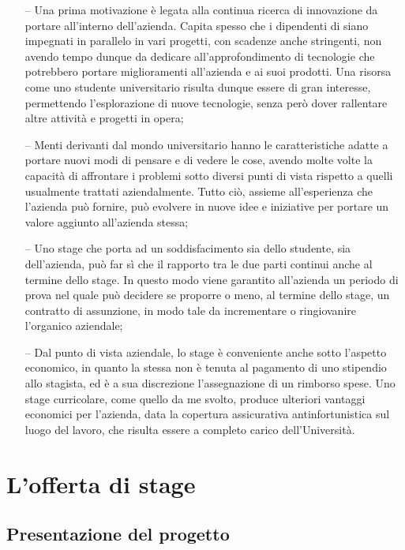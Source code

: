 \begin{itemize}
	\item[--] {Una prima motivazione è legata alla continua ricerca di innovazione da portare all'interno dell'azienda. Capita spesso che i dipendenti di \nomeAzienda siano impegnati in parallelo in vari progetti, con scadenze anche stringenti, non avendo tempo dunque da dedicare all'approfondimento di tecnologie che potrebbero portare miglioramenti all'azienda e ai suoi prodotti. Una risorsa come uno studente universitario risulta dunque essere di gran interesse, permettendo l'esplorazione di nuove tecnologie, senza però dover rallentare altre attività e progetti in opera;}

	\item[--] {Menti derivanti dal mondo universitario hanno le caratteristiche adatte a portare nuovi modi di pensare e di vedere le cose, avendo molte volte la capacità di affrontare i problemi sotto diversi punti di vista rispetto a quelli usualmente trattati aziendalmente. Tutto ciò, assieme all'esperienza che l'azienda può fornire, può evolvere in nuove idee e iniziative per portare un valore aggiunto all'azienda stessa;}
	
	\item[--] {Uno stage che porta ad un soddisfacimento sia dello studente, sia dell'azienda, può far sì che il rapporto tra le due parti continui anche al termine dello stage. In questo modo viene garantito all'azienda un periodo di prova nel quale può decidere se proporre o meno, al termine dello stage, un contratto di assunzione, in modo tale da incrementare o ringiovanire l'organico aziendale;}
	
	\item[--] {Dal punto di vista aziendale, lo stage è conveniente anche sotto l'aspetto economico, in quanto la stessa non è tenuta al pagamento di uno stipendio allo stagista, ed è a sua discrezione l'assegnazione di un rimborso spese. Uno stage curricolare, come quello da me svolto, produce ulteriori vantaggi economici per l'azienda, data la copertura assicurativa antinfortunistica sul luogo del lavoro, che risulta essere a completo carico dell'Università.}
	
\end{itemize}

\section{L'offerta di stage}

	\subsection{Presentazione del progetto}
	
